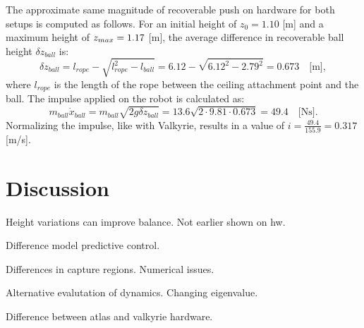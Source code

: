 The approximate same magnitude of recoverable push on hardware for both setups is computed as follows. For an initial height of $z_0=1.10$ [m] and a maximum height of $z_{max}=1.17$ [m], the average difference in recoverable ball height $\delta z_{ball}$ is:
\begin{equation}
	\delta z_{ball} = l_{rope} - \sqrt{l_{rope}^2-l_{ball}} = 6.12-\sqrt{6.12^2 - 2.79^2} = 0.673 \quad \text{[m]},
\end{equation}
where $l_{rope}$ is the length of the rope between the ceiling attachment point and the ball. The impulse applied on the robot is calculated as:
\begin{equation}
m_{ball}\dot{x}_{ball} = m_{ball}\sqrt{2g\delta z_{ball} } = 13.6\sqrt{2 \cdot 9.81 \cdot 0.673} = 49.4 \quad \text{[Ns]}.
\end{equation}
Normalizing the impulse, like with Valkyrie, results in a value of $i=\frac{49.4}{155.9}=0.317$ [m/s].

\section{Discussion}
Height variations can improve balance. Not earlier shown on hw.

Difference model predictive control.

Differences in capture regions. Numerical issues.

Alternative evalutation of dynamics. Changing eigenvalue.

Difference between atlas and valkyrie hardware.



